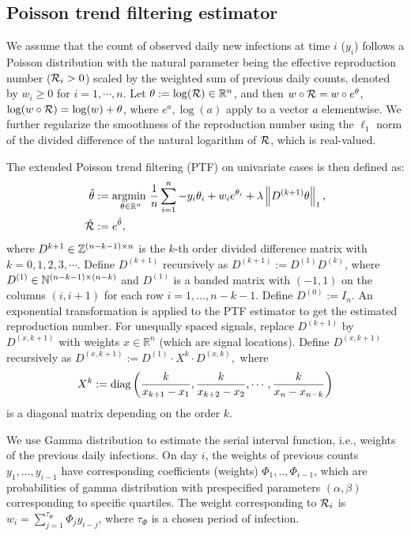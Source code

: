\subsection{Poisson trend filtering estimator} %

We assume that the count of observed daily new infections at time $i$ ($y_i$) follows a Poisson distribution with the natural parameter being the effective reproduction number ($\mathcal{R}_i > 0$) scaled by the weighted sum of previous daily counts, denoted by $w_i \geq 0$ for $i=1,\cdots,n$. %
Let $\theta:=\log(\mathcal{R}) \in \mathbb{R}^n$, and then $w\circ \mathcal{R} = w\circ e^{\theta}$, $\log(w\circ \mathcal{R}) = \log(w) + \theta$, where $e^{a}, \log(a)$ apply to a vector $a$ elementwise. We further regularize the smoothness of the reproduction number using the $\ell_1$ norm of the divided difference of the natural logarithm of $\mathcal{R}$, which is real-valued. 

The extended Poisson trend filtering (PTF) on univariate cases is then defined as:
\begin{equation} \label{eq:rt-ptf}
    \begin{split}
        \hat{\theta} &:= \underset{\theta\in\mathbb{R}^n}{\operatorname*{argmin}\ } \frac{1}{n}\sum_{i=1}^n -y_i \theta_i + w_i e^{\theta_i} + \lambda \left\lVert D^{(k+1)} \theta \right\rVert_1, \\
        \hat{\mathcal{R}} &:= e^{\hat{\theta}},
    \end{split}
\end{equation}
where $D^{k+1} \in \mathbb{Z}^{(n-k-1)\times n}$ is the $k$-th order divided difference matrix with $k=0,1,2,3,\cdots$. Define $D^{(k+1)}$ recursively as $D^{(k+1)} := D^{(1)} D^{(k)}$, where $D^{(1)}\in\mathbb{N}^{(n-k-1)\times (n-k)}$ and $D^{(1)}$ is a banded matrix with $(-1,1)$ on the columns $(i,i+1)$ for each row $i=1,...,n-k-1$. Define $D^{(0)} := I_n$. An exponential transformation is applied to the PTF estimator to get the estimated reproduction number.
%
For unequally spaced signals, replace $D^{(k+1)}$ by $D^{(x,k+1)}$ with weights $x\in \mathbb{R}^n$ (which are signal locations). Define $D^{(x,k+1)}$ recursively as $D^{(x,k+1)} := D^{(1)}\cdot X^k \cdot D^{(x,k)}, $
where $$X^k := \operatorname*{diag} \left(\frac{k}{x_{k+1} - x_1}, \frac{k}{x_{k+2} - x_2}, \cdots, \frac{k}{x_n - x_{n-k}} \right)$$ is a diagonal matrix depending on the order $k$.

We use Gamma distribution to estimate the serial interval function, i.e., weights of the previous daily infections. On day $i$, the weights of previous counts $y_1,...,y_{i-1}$ have corresponding coefficients (weights) $\Phi_1,..,\Phi_{i-1}$, which are probabilities of gamma distribution with prespecified parameters $(\alpha,\beta)$ corresponding to specific quartiles. The weight corresponding to $\mathcal{R}_i$ is $w_i = \sum_{j=1}^{\tau_{\Phi}} \Phi_j y_{i-j}$, where $\tau_{\Phi}$ is a chosen period of infection.


